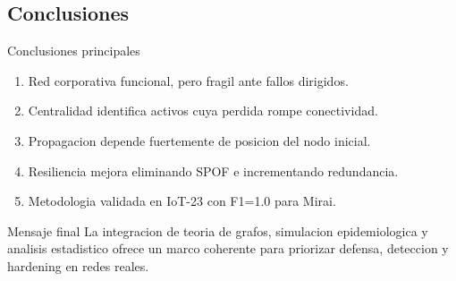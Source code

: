 \subsection{Conclusiones}\label{conclusiones}

\begin{frame}{Conclusiones principales}
\protect{}\label{conclusiones-principales}
\begin{enumerate}
\tightlist
\item
  Red corporativa funcional, pero fragil ante fallos dirigidos.
\item
  Centralidad identifica activos cuya perdida rompe conectividad.
\item
  Propagacion depende fuertemente de posicion del nodo inicial.
\item
  Resiliencia mejora eliminando SPOF e incrementando redundancia.
\item
  Metodologia validada en IoT-23 con F1=1.0 para Mirai.
\end{enumerate}
\end{frame}

\begin{frame}{Mensaje final}
\protect{}\label{mensaje-final}
La integracion de teoria de grafos, simulacion epidemiologica y analisis
estadistico ofrece un marco coherente para priorizar defensa, deteccion
y hardening en redes reales.
\end{frame}
